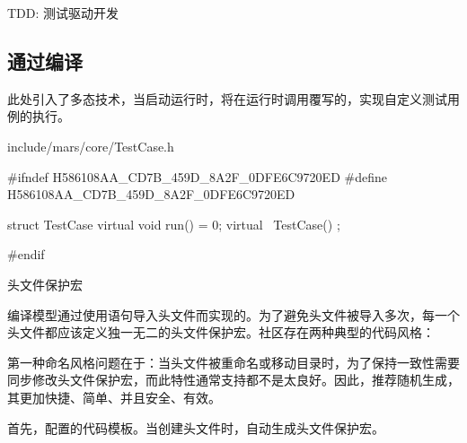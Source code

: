 \begin{content}
\begin{episode}{TDD: 测试驱动开发}
\begin{content}
\begin{enum}
\end{enum}

\end{content}

\end{episode}

\subsection{通过编译}

此处引入了多态技术，当启动运行时，将在运行时调用覆写的，实现自定义测试用例的执行。

\begin{nodiff}{include/mars/core/TestCase.h}
 \begin{c++}
#ifndef H586108AA_CD7B_459D_8A2F_0DFE6C9720ED
#define H586108AA_CD7B_459D_8A2F_0DFE6C9720ED

struct TestCase {
  virtual void run() = 0;
  virtual ~TestCase() {}
};

#endif
  \end{c++}
\end{nodiff}

\begin{episode}{头文件保护宏}

\begin{content}

编译模型通过使用语句导入头文件而实现的。为了避免头文件被导入多次，每一个头文件都应该定义独一无二的头文件保护宏。社区存在两种典型的代码风格：

\begin{enum}
\end{enum}

第一种命名风格问题在于：当头文件被重命名或移动目录时，为了保持一致性需要同步修改头文件保护宏，而此特性通常支持都不是太良好。因此，推荐随机生成，其更加快捷、简单、并且安全、有效。

首先，配置的代码模板。当创建头文件时，自动生成头文件保护宏。


\end{content}
\end{episode}
\end{content}
